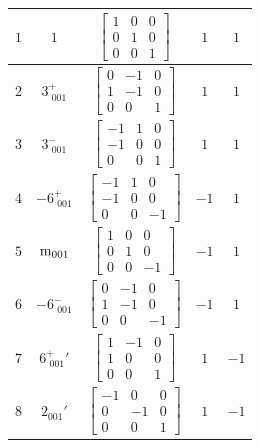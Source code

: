 \documentclass[fleqn,8pt]{jsarticle}
\begin{document}
\begin{longtable}{ccccc}
$ 1 $ & $ 1 $ & $ \begin{bmatrix} 1 & 0 & 0 \\ 0 & 1 & 0 \\ 0 & 0 & 1 \end{bmatrix} $ & $ 1 $ & $ 1 $ \\ \hline
$ 2 $ & $ 3^{+}_{\,\,001} $ & $ \begin{bmatrix} 0 & -1 & 0 \\ 1 & -1 & 0 \\ 0 & 0 & 1 \end{bmatrix} $ & $ 1 $ & $ 1 $ \\ \hline
$ 3 $ & $ 3^{-}_{\,\,001} $ & $ \begin{bmatrix} -1 & 1 & 0 \\ -1 & 0 & 0 \\ 0 & 0 & 1 \end{bmatrix} $ & $ 1 $ & $ 1 $ \\ \hline
$ 4 $ & $ -6^{+}_{\,\,001} $ & $ \begin{bmatrix} -1 & 1 & 0 \\ -1 & 0 & 0 \\ 0 & 0 & -1 \end{bmatrix} $ & $ -1 $ & $ 1 $ \\ \hline
$ 5 $ & $ {\rm m}_{001} $ & $ \begin{bmatrix} 1 & 0 & 0 \\ 0 & 1 & 0 \\ 0 & 0 & -1 \end{bmatrix} $ & $ -1 $ & $ 1 $ \\ \hline
$ 6 $ & $ -6^{-}_{\,\,001} $ & $ \begin{bmatrix} 0 & -1 & 0 \\ 1 & -1 & 0 \\ 0 & 0 & -1 \end{bmatrix} $ & $ -1 $ & $ 1 $ \\ \hline
$ 7 $ & $ 6^{+}_{\,\,001}{}' $ & $ \begin{bmatrix} 1 & -1 & 0 \\ 1 & 0 & 0 \\ 0 & 0 & 1 \end{bmatrix} $ & $ 1 $ & $ -1 $ \\ \hline
$ 8 $ & $ 2{}_{001}{}' $ & $ \begin{bmatrix} -1 & 0 & 0 \\ 0 & -1 & 0 \\ 0 & 0 & 1 \end{bmatrix} $ & $ 1 $ & $ -1 $ \\ \hline

\end{longtable}
\end{document}

